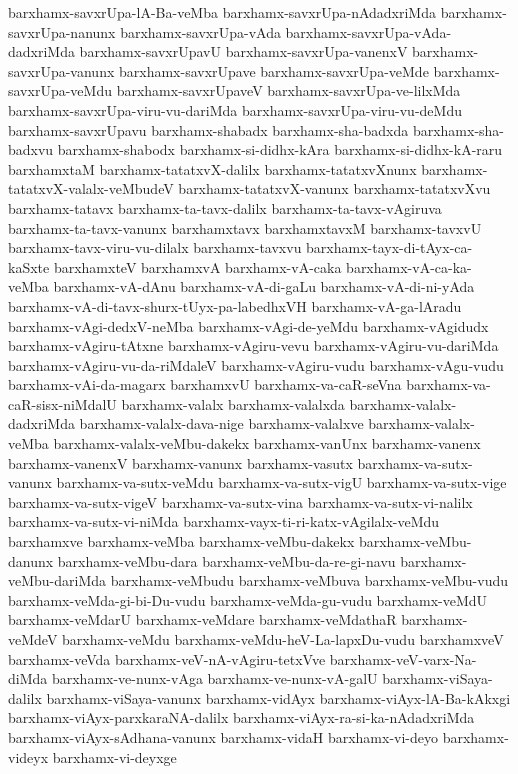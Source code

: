 {barxhamx-savxrUpa-lA-Ba-veMba
barxhamx-savxrUpa-nAdadxriMda
barxhamx-savxrUpa-nanunx
barxhamx-savxrUpa-vAda
barxhamx-savxrUpa-vAda-dadxriMda
barxhamx-savxrUpavU
barxhamx-savxrUpa-vanenxV
barxhamx-savxrUpa-vanunx
barxhamx-savxrUpave
barxhamx-savxrUpa-veMde
barxhamx-savxrUpa-veMdu
barxhamx-savxrUpaveV
barxhamx-savxrUpa-ve-lilxMda
barxhamx-savxrUpa-viru-vu-dariMda
barxhamx-savxrUpa-viru-vu-deMdu
barxhamx-savxrUpavu
barxhamx-shabadx
barxhamx-sha-badxda
barxhamx-sha-badxvu
barxhamx-shabodx
barxhamx-si-didhx-kAra
barxhamx-si-didhx-kA-raru
barxhamxtaM
barxhamx-tatatxvX-dalilx
barxhamx-tatatxvXnunx
barxhamx-tatatxvX-valalx-veMbudeV
barxhamx-tatatxvX-vanunx
barxhamx-tatatxvXvu
barxhamx-tatavx
barxhamx-ta-tavx-dalilx
barxhamx-ta-tavx-vAgiruva
barxhamx-ta-tavx-vanunx
barxhamxtavx
barxhamxtavxM
barxhamx-tavxvU
barxhamx-tavx-viru-vu-dilalx
barxhamx-tavxvu
barxhamx-tayx-di-tAyx-ca-kaSxte
barxhamxteV
barxhamxvA
barxhamx-vA-caka
barxhamx-vA-ca-ka-veMba
barxhamx-vA-dAnu
barxhamx-vA-di-gaLu
barxhamx-vA-di-ni-yAda
barxhamx-vA-di-tavx-shurx-tUyx-pa-labedhxVH
barxhamx-vA-ga-lAradu
barxhamx-vAgi-dedxV-neMba
barxhamx-vAgi-de-yeMdu
barxhamx-vAgidudx
barxhamx-vAgiru-tAtxne
barxhamx-vAgiru-vevu
barxhamx-vAgiru-vu-dariMda
barxhamx-vAgiru-vu-da-riMdaleV
barxhamx-vAgiru-vudu
barxhamx-vAgu-vudu
barxhamx-vAi-da-magarx
barxhamxvU
barxhamx-va-caR-seVna
barxhamx-va-caR-sisx-niMdalU
barxhamx-valalx
barxhamx-valalxda
barxhamx-valalx-dadxriMda
barxhamx-valalx-dava-nige
barxhamx-valalxve
barxhamx-valalx-veMba
barxhamx-valalx-veMbu-dakekx
barxhamx-vanUnx
barxhamx-vanenx
barxhamx-vanenxV
barxhamx-vanunx
barxhamx-vasutx
barxhamx-va-sutx-vanunx
barxhamx-va-sutx-veMdu
barxhamx-va-sutx-vigU
barxhamx-va-sutx-vige
barxhamx-va-sutx-vigeV
barxhamx-va-sutx-vina
barxhamx-va-sutx-vi-nalilx
barxhamx-va-sutx-vi-niMda
barxhamx-vayx-ti-ri-katx-vAgilalx-veMdu
barxhamxve
barxhamx-veMba
barxhamx-veMbu-dakekx
barxhamx-veMbu-danunx
barxhamx-veMbu-dara
barxhamx-veMbu-da-re-gi-navu
barxhamx-veMbu-dariMda
barxhamx-veMbudu
barxhamx-veMbuva
barxhamx-veMbu-vudu
barxhamx-veMda-gi-bi-Du-vudu
barxhamx-veMda-gu-vudu
barxhamx-veMdU
barxhamx-veMdarU
barxhamx-veMdare
barxhamx-veMdathaR
barxhamx-veMdeV
barxhamx-veMdu
barxhamx-veMdu-heV-La-lapxDu-vudu
barxhamxveV
barxhamx-veVda
barxhamx-veV-nA-vAgiru-tetxVve
barxhamx-veV-varx-Na-diMda
barxhamx-ve-nunx-vAga
barxhamx-ve-nunx-vA-galU
barxhamx-viSaya-dalilx
barxhamx-viSaya-vanunx
barxhamx-vidAyx
barxhamx-viAyx-lA-Ba-kAkxgi
barxhamx-viAyx-parxkaraNA-dalilx
barxhamx-viAyx-ra-si-ka-nAdadxriMda
barxhamx-viAyx-sAdhana-vanunx
barxhamx-vidaH
barxhamx-vi-deyo
barxhamx-videyx
barxhamx-vi-deyxge
}
